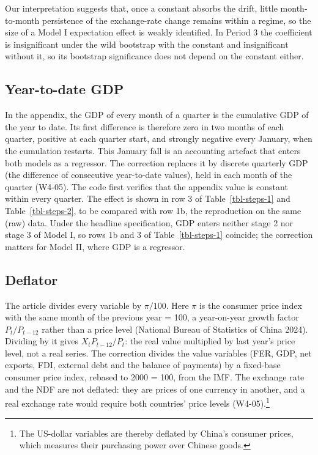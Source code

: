 \documentclass[
  12pt,
  a4paper,
]{article}
\begin{document}
Our interpretation suggests that, once a constant absorbs the drift,
little month-to-month persistence of the exchange-rate change remains
within a regime, so the size of a Model I expectation effect is weakly
identified. In Period 3 the coefficient is insignificant under the wild
bootstrap with the constant and insignificant without it, so its
bootstrap significance does not depend on the constant either.

\subsection{Year-to-date GDP}\label{year-to-date-gdp}

In the appendix, the GDP of every month of a quarter is the cumulative
GDP of the year to date. Its first difference is therefore zero in two
months of each quarter, positive at each quarter start, and strongly
negative every January, when the cumulation restarts. This January fall
is an accounting artefact that enters both models as a regressor. The
correction replaces it by discrete quarterly GDP (the difference of
consecutive year-to-date values), held in each month of the quarter
(W4-05). The code first verifies that the appendix value is constant
within every quarter. The effect is shown in row 3 of
Table~\ref{tbl-steps-1} and Table~\ref{tbl-steps-2}, to be compared with
row 1b, the reproduction on the same (raw) data. Under the headline
specification, GDP enters neither stage 2 nor stage 3 of Model I, so
rows 1b and 3 of Table~\ref{tbl-steps-1} coincide; the correction
matters for Model II, where GDP is a regressor.

\subsection{Deflator}\label{sec-deflator}

The article divides every variable by \(\pi/100\). Here \(\pi\) is the
consumer price index with the same month of the previous year = 100, a
year-on-year growth factor \(P_t/P_{t-12}\) rather than a price level
(National Bureau of Statistics of China 2024). Dividing by it gives
\(X_t P_{t-12}/P_t\): the real value multiplied by last year's price
level, not a real series. The correction divides the value variables
(FER, GDP, net exports, FDI, external debt and the balance of payments)
by a fixed-base consumer price index, rebased to 2000 = 100, from the
IMF. The exchange rate and the NDF are not deflated: they are prices of
one currency in another, and a real exchange rate would require both
countries' price levels (W4-05).\footnote{The US-dollar variables are
  thereby deflated by China's consumer prices, which measures their
  purchasing power over Chinese goods.}
\end{document}
